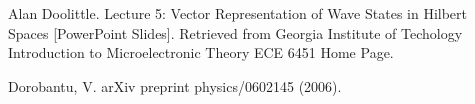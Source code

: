 \begin{thebibliography}{99.}%
\bibitem{} Alan Doolittle. Lecture 5: Vector Representation of Wave States in Hilbert Spaces [PowerPoint Slides].  Retrieved from Georgia Institute of Techology Introduction to Microelectronic Theory ECE 6451 Home Page.

\bibitem{}Dorobantu, V.  arXiv preprint physics/0602145 (2006).

\end{thebibliography}

